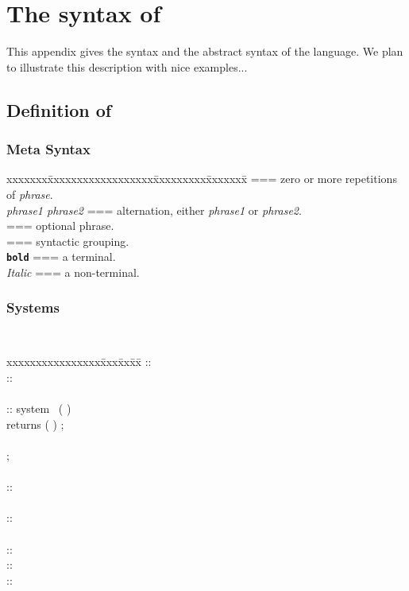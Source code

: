 \chapter{The syntax of \alfa{}}
\label{appendixalpha}

This appendix gives the syntax and the abstract syntax
of the \alfa{} language. We plan to illustrate this description
with nice examples...

\section{Definition of \Alpha}
\label{alpha1}

\subsection{Meta Syntax}
\begin{tabbing}
xxxxxxx\= xxxxxxxxxxxxxxxxxx\= xxxxxxxxx\= xxxxxxx\= \kill
{} \>===\>  zero or more repetitions of {\sl phrase}.\\
\> {\sl phrase1 {\sl \Alt} phrase2} \>===\> alternation, either {\sl
phrase1} or {\sl phrase2}.\\
\>  [\ldots] \>===\> optional phrase.\\
\> \Group{\ldots} \>===\> syntactic grouping.\\
\> {\bf \tt bold} \>===\> a terminal.\\
\> {\sl Italic} \>===\> a non-terminal.\\
\end{tabbing}

\subsection{Systems}
{\tt
\begin{tabbing}
xxxxxxxxxxxxxxxx\= xxx\= xx\=  xx\= \kill
\Program     \> :: \>\> \PDecl\ \PDecl *\\
\PDecl       \> :: \>\> \SystemDecl\\
\\\SystemDecl   \> :: \>\> system\ \Name \Opt{ : \ParamDecl }
                                    ( \InputDeclList )\\
\> \>\>\>  returns ( \OutputDeclList ) ;\\
\> \>\>\>  \\
\> \>\>\> \EquationBlock ;\\
\\
\Name \>::\>\> \Identifier\\
\\
\ParamDecl  \> :: \>\> \Domain \\
\\
\InputDeclList \>::\>\> \VarDeclList\\
\OutputDeclList \>::\>\> \VarDeclList\\
\LocalDeclList \>::\>\> \VarDeclList\\
\end{tabbing}
}

